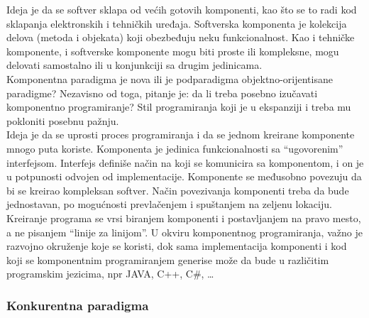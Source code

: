 \documentclass[../main.tex]{subfiles}
\begin{document}
Ideja je da se softver sklapa od većih gotovih komponenti, kao što se to radi kod sklapanja elektronskih i tehničkih uređaja. Softverska komponenta je kolekcija delova (metoda i objekata) koji obezbeđuju neku funkcionalnost. Kao i tehničke komponente, i softverske komponente mogu biti proste ili kompleksne, mogu delovati samostalno ili u konjunkciji sa drugim jedinicama. \\
Komponentna paradigma je nova ili je podparadigma objektno-orijentisane paradigme? Nezavisno od toga, pitanje je: da li treba posebno izučavati komponentno programiranje? Stil programiranja koji je u ekspanziji i treba mu pokloniti posebnu pažnju.\\
Ideja je da se uprosti proces programiranja i da se jednom kreirane komponente mnogo puta koriste. Komponenta je jedinica funkcionalnosti sa ``ugovorenim'' interfejsom. Interfejs definiše način na koji se komunicira sa komponentom, i on je u potpunosti odvojen od implementacije. Komponente se međusobno povezuju da bi se kreirao kompleksan softver. Način povezivanja komponenti treba da bude jednostavan, po mogućnosti prevlačenjem i spuštanjem na zeljenu lokaciju. Kreiranje programa se vrsi biranjem komponenti i postavljanjem na pravo mesto, a ne pisanjem ``linije za linijom''. U okviru komponentnog programiranja, važno je razvojno okruženje koje se koristi, dok sama implementacija komponenti i kod koji se komponentnim programiranjem generise može da bude u različitim programskim jezicima, npr JAVA, C++, C\#, \ldots

\subsubsection{Konkurentna paradigma}										
\end{document}
